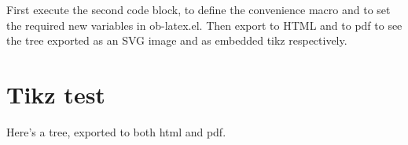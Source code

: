 \documentclass[11pt]{article}
\author{scott}
\date{\today}
\title{}
\begin{document}
\tableofcontents

First execute the second code block, to define the convenience macro
and to set the required new variables in ob-latex.el.  Then export to
HTML and to pdf to see the tree exported as an SVG image and as
embedded tikz respectively.

\section{Tikz test}
\label{sec:org5ea408c}
Here's a tree, exported to both html and pdf.

\usetikzlibrary{trees}
\end{document}
